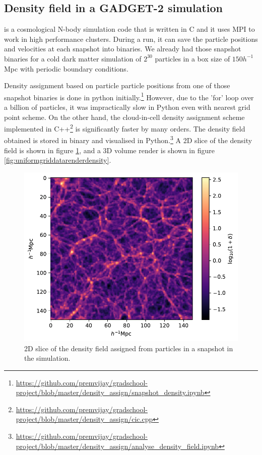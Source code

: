 \documentclass[12pt]{article}
\begin{document}
\subsection*{Density field in a GADGET-2 simulation}
\cite{gadget} is a cosmological N-body simulation code that is written in C and it uses MPI to work in high performance clusters. During a run, it can save the particle positions and velocities at each snapshot into binaries. We already had those snapshot binaries for a cold dark matter simulation of $2^{30}$ particles in a box size of  $150 h^{-1}$ Mpc with periodic boundary conditions. \cite{aseem_shadab}

 
Density assignment based on particle particle positions from one of those snapshot binaries is done in python initially.\footnote{\url{https://github.com/premvijay/gradschool-project/blob/master/density_assign/snapshot_density.ipynb}} However, due to the 'for' loop over a billion of particles, it was impractically slow in Python even with nearest grid point scheme. On the other hand, the cloud-in-cell density assignment scheme implemented in C++\footnote{\url{https://github.com/premvijay/gradschool-project/blob/master/density_assign/cic.cpp}} is significantly faster by many orders. The density field obtained is stored in binary and visualised in Python.\footnote{\url{https://github.com/premvijay/gradschool-project/blob/master/density_assign/analyse_density_field.ipynb}} A 2D slice of the density field is shown in figure \ref{fig:density-field-2d}, and a 3D volume render is shown in figure \ref{fig:uniformgriddatarenderdensity}.



\begin{figure}[H]
	\centering
	\includegraphics[width=0.7\linewidth]{../density_assign/density-field-2D}
	\caption{2D slice of the density field assigned from particles in a snapshot in the simulation.}
	\label{fig:density-field-2d}
\end{figure}
\end{document}
